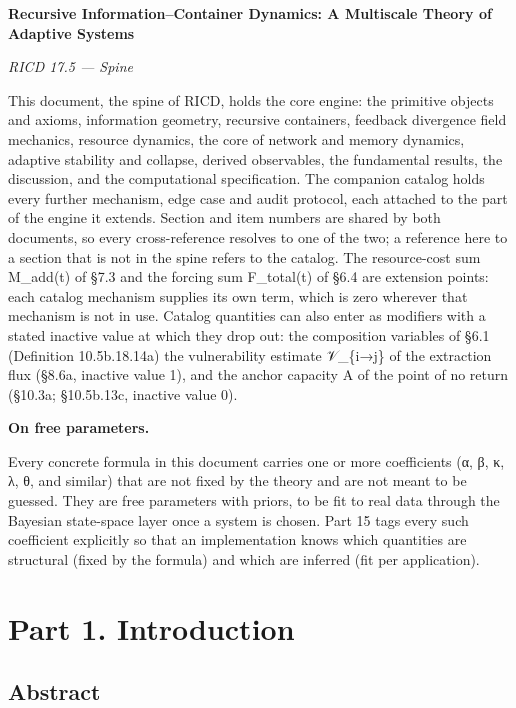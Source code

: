 \documentclass[
]{article}
\author{}
\date{}
\begin{document}
\textbf{Recursive Information--Container Dynamics: A Multiscale Theory
of Adaptive Systems}

\emph{RICD 17.5 --- Spine}

This document, the spine of RICD, holds the core engine: the primitive
objects and axioms, information geometry, recursive containers, feedback
divergence field mechanics, resource dynamics, the core of network and
memory dynamics, adaptive stability and collapse, derived observables,
the fundamental results, the discussion, and the computational
specification. The companion catalog holds every further mechanism, edge
case and audit protocol, each attached to the part of the engine it
extends. Section and item numbers are shared by both documents, so every
cross-reference resolves to one of the two; a reference here to a
section that is not in the spine refers to the catalog. The
resource-cost sum M\_add(t) of §7.3 and the forcing sum F\_total(t) of
§6.4 are extension points: each catalog mechanism supplies its own term,
which is zero wherever that mechanism is not in use. Catalog quantities
can also enter as modifiers with a stated inactive value at which they
drop out: the composition variables of §6.1 (Definition 10.5b.18.14a)
the vulnerability estimate 𝒱\_\{i→j\} of the extraction flux (§8.6a,
inactive value 1), and the anchor capacity A of the point of no return
(§10.3a; §10.5b.13c, inactive value 0).

\textbf{On free parameters.}

Every concrete formula in this document carries one or more coefficients
(α, β, κ, λ, θ, and similar) that are not fixed by the theory and are
not meant to be guessed. They are free parameters with priors, to be fit
to real data through the Bayesian state-space layer once a system is
chosen. Part 15 tags every such coefficient explicitly so that an
implementation knows which quantities are structural (fixed by the
formula) and which are inferred (fit per application).

\hypertarget{part-1.-introduction}{%
\section{Part 1. Introduction}\label{part-1.-introduction}}

\hypertarget{abstract}{%
\subsection{Abstract}\label{abstract}}
\end{document}
